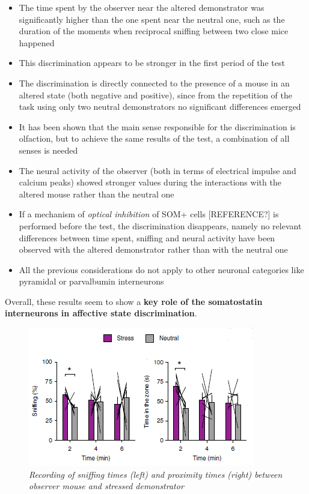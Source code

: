 \documentclass[a4paper]{article}
\begin{document}
 \begin{itemize}
 	
 	\item The time spent by the observer near the altered demonstrator was significantly higher than the one spent near the neutral one, such as the duration of the moments when reciprocal sniffing between two close mice happened
 	
 	\item This  discrimination appears to be stronger in the first period of the test
 	
 	\item The discrimination is directly connected to the presence of a mouse in an altered state (both negative and positive), since from the repetition of the task using only two neutral demonstrators no significant differences emerged
 	
 	\item It has been shown that the main sense responsible for the discrimination is olfaction, but to achieve the same results of the test, a combination of all senses is needed
 	
 	\item The neural activity of the observer (both in terms of electrical impulse and  calcium peaks) showed stronger values during the interactions with the altered mouse rather than the neutral one
 	
 	\item  If a mechanism of \textit{optical inhibition} of SOM+ cells [REFERENCE?] is performed before the test, the discrimination disappears, namely no relevant differences between time spent, sniffing and neural activity have been observed with the altered demonstrator rather than with the neutral one
 	
 	\item All the previous considerations do not apply to other neuronal categories like pyramidal or parvalbumin interneurons
 	 
 \end{itemize}
 
 Overall, these results seem to show a \textbf{key role of the somatostatin interneurons in affective state discrimination}.

	\begin{figure}
	\begin{center}
		\includegraphics[scale=.99]{scheggia.png} 
	\end{center} 
	\caption{\textit{Recording of sniffing times (left) and proximity times (right) between observer mouse and stressed demonstrator}}
	
\end{figure}
\end{document}
